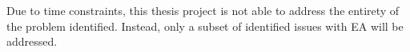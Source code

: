 Due to time constraints, this thesis project is not able to address the entirety of the problem identified. Instead, only a subset of identified issues with EA will be addressed. 